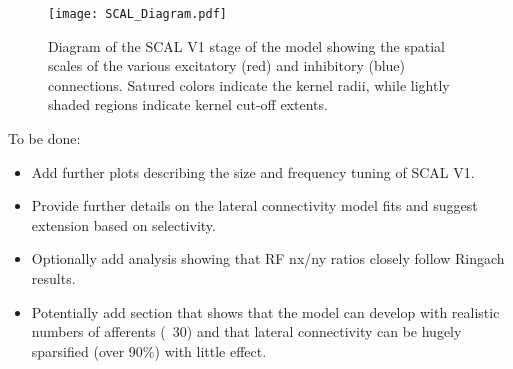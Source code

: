 \begin{figure}
	\centering
        \texttt{[image: SCAL\_Diagram.pdf]}
	\caption{Diagram of the SCAL V1 stage of the model showing
          the spatial scales of the various excitatory (red) and
          inhibitory (blue) connections. Satured colors indicate the
          kernel radii, while lightly shaded regions indicate kernel
          cut-off extents.}
	\label{SCALDiagram}
\end{figure}


To be done:

\begin{itemize}
  \item Add further plots describing the size and frequency tuning of SCAL V1.
  \item Provide further details on the lateral connectivity model fits and suggest extension based on selectivity.
  \item Optionally add analysis showing that RF nx/ny ratios closely
    follow Ringach results.
  \item Potentially add section that shows that the model can develop with realistic numbers of afferents (~30) and that lateral connectivity can be hugely sparsified (over 90\%) with little effect.
\end{itemize}
